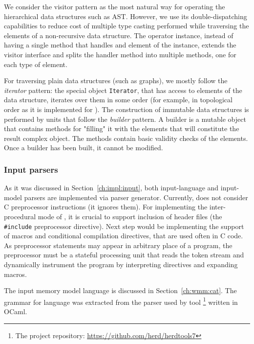 We consider the visitor pattern as the most natural way for operating the hierarchical data structures such as AST.
However, we use its double-dispatching capabilities to reduce cost of multiple type casting performed while traversing the elements of a non-recursive data structure.
The operator instance, instead of having a single method that handles and element of the instance, extends the visitor interface and splits the handler method into multiple methods, one for each type of element.

For traversing plain data structures (such as graphs), we mostly follow the \textit{iterator} pattern: the special object \texttt{Iterator}, that has access to elements of the data structure, iterates over them in some order (for example, in topological order as it is implemented for \xgraph{}).
The construction of immutable data structures is performed by units that follow the \textit{builder} pattern.
A builder is a mutable object that contains methods for "filling" it with the elements that will constitute the result complex object.
The methods contain basic validity checks of the elements.
Once a builder has been built, it cannot be modified.


\subsubsection{Input parsers}
\label{ch:impl:proc:input-parser}

As it was discussed in Section~\ref{ch:impl:input}, both input-language and input-model parsers are implemented via  parser generator.
Currently, \porthos[2] does not consider C preprocessor instructions (it ignores them).
For implementing the inter-procedural mode of \porthos{}, it is crucial to support inclusion of header files (the \texttt{\#include} preprocessor directive).
Next step would be implementing the support of macros and conditional compilation directives, that are used often in C code.
As preprocessor statements may appear in arbitrary place of a program, the preprocessor must be a stateful processing unit that reads the token stream and dynamically instrument the program by interpreting directives and expanding macros.

The input memory model language \cat{} is discussed in Section~\ref{ch:wmm:cat}.
The  grammar for \cat{} language was extracted from the parser used by  tool%
%
\footnote{The  project repository: \url{https://github.com/herd/herdtools7}} %
%
written in OCaml.


